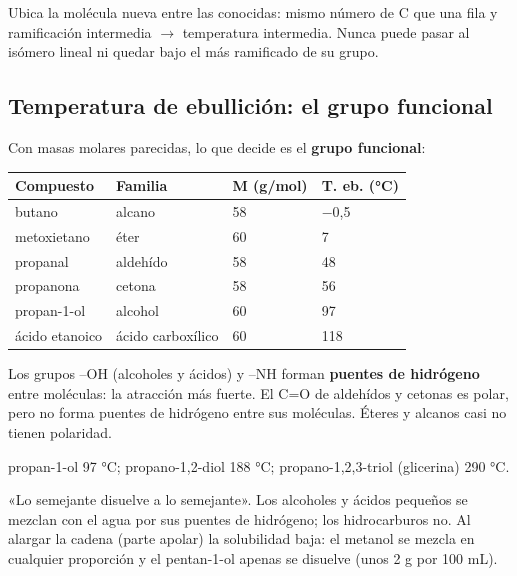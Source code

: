 \begin{ojo} Ubica la molécula nueva entre las conocidas: mismo número de C que una fila y ramificación intermedia \ensuremath{\rightarrow} temperatura intermedia. Nunca puede pasar al isómero lineal ni quedar bajo el más ramificado de su grupo.\end{ojo}
\subsection{Temperatura de ebullición: el grupo funcional}
Con masas molares parecidas, lo que decide es el \textbf{grupo funcional}:

 
\begin{center}\small
\begin{tabular}{@{}llll@{}}
\toprule
\textbf{Compuesto} & \textbf{Familia} & \textbf{M (g/mol)} & \textbf{T. eb. (°C)} \\
\midrule
butano & alcano & 58 & \ensuremath{-}0,5 \\
metoxietano & éter & 60 & 7 \\
propanal & aldehído & 58 & 48 \\
propanona & cetona & 58 & 56 \\
propan-1-ol & alcohol & 60 & 97 \\
ácido etanoico & ácido carboxílico & 60 & 118 \\
\bottomrule
\end{tabular}
\end{center}
  
\begin{clave} Los grupos --OH (alcoholes y ácidos) y --NH forman \textbf{puentes de hidrógeno} entre moléculas: la atracción más fuerte. El C=O de aldehídos y cetonas es polar, pero no forma puentes de hidrógeno entre sus moléculas. Éteres y alcanos casi no tienen polaridad.\end{clave}
 
\begin{clave} propan-1-ol 97 °C; propano-1,2-diol 188 °C; propano-1,2,3-triol (glicerina) 290 °C.\end{clave}
 
\begin{clave} «Lo semejante disuelve a lo semejante». Los alcoholes y ácidos pequeños se mezclan con el agua por sus puentes de hidrógeno; los hidrocarburos no. Al alargar la cadena (parte apolar) la solubilidad baja: el metanol se mezcla en cualquier proporción y el pentan-1-ol apenas se disuelve (unos 2 g por 100 mL).\end{clave}
